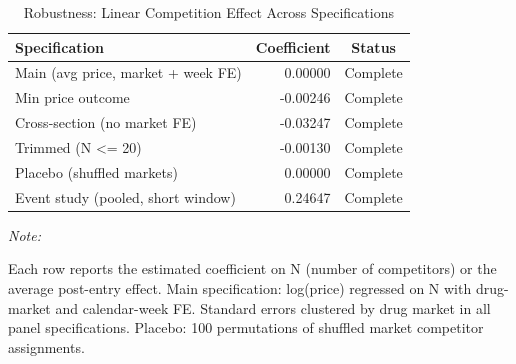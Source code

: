 \begin{table}[!h]
\centering
\caption{\label{tab:tab:robustness}Robustness: Linear Competition Effect Across Specifications}
\centering
\begin{threeparttable}
\begin{tabular}[t]{lrc}
\toprule
Specification & Coefficient & Status\\
\midrule
Main (avg price, market + week FE) & 0.00000 & Complete\\
Min price outcome & -0.00246 & Complete\\
Cross-section (no market FE) & -0.03247 & Complete\\
Trimmed (N <= 20) & -0.00130 & Complete\\
Placebo (shuffled markets) & 0.00000 & Complete\\
\addlinespace
Event study (pooled, short window) & 0.24647 & Complete\\
\bottomrule
\end{tabular}
\begin{tablenotes}
\item \textit{Note: } 
\item Each row reports the estimated coefficient on N (number of competitors) or the average post-entry effect. Main specification: log(price) regressed on N with drug-market and calendar-week FE. Standard errors clustered by drug market in all panel specifications. Placebo: 100 permutations of shuffled market competitor assignments.
\end{tablenotes}
\end{threeparttable}
\end{table}
